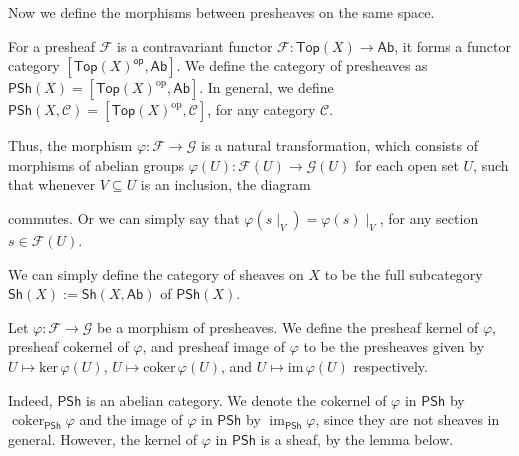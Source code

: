 \documentclass[11pt]{article}
\begin{document}
Now we define the morphisms between presheaves on the same space. 

\begin{definition}
    For a presheaf $\mathscr{F}$ is a contravariant functor 
    $\mathscr{F}: \mathsf{Top}(X) \to \mathsf{Ab}$, 
    it forms a functor category 
    $[\mathsf{Top}(X)^{\mathsf{op}},\mathsf{Ab}]$. 
    We define the category of presheaves as 
    $\mathsf{PSh}(X)=[\mathsf{Top}(X)^{\mathrm{op}},\mathsf{Ab}]$. 
    In general, we define $\mathsf{PSh}(X,\mathcal{C})=[\mathsf{Top}(X)^{\mathrm{op}},\mathcal{C}]$, 
    for any category $ \mathcal{C} $. 

    Thus, the morphism $\varphi: \mathscr{F} \to \mathscr{G}$ 
    is a natural transformation, 
    which consists of morphisms of abelian groups 
    $\varphi(U): \mathscr{F}(U) \to \mathscr{G}(U)$ 
    for each open set $U$, such that whenever 
    $V \subseteq U$ is an inclusion, the diagram 
    \begin{center}
    \end{center}
    commutes. Or we can simply say that $ \varphi(s \mid_{V})=\varphi(s)\mid_{V} $, 
    for any section $ s \in \mathscr{F}(U) $. 

    We can simply define the category of sheaves on $ X $ 
    to be the full subcategory $ \mathsf{Sh}(X):=\mathsf{Sh}(X,\mathsf{Ab}) $ of $ \mathsf{PSh}(X) $. 
\end{definition}

\begin{definition}
    Let $\varphi: \mathscr{F} \to \mathscr{G}$ be a morphism of presheaves. 
    We define the presheaf kernel of $\varphi$, 
    presheaf cokernel of $\varphi$, and presheaf image 
    of $\varphi$ to be the presheaves given by 
    $U \mapsto \mathrm{ker}\,\varphi(U)$, 
    $U \mapsto \mathrm{coker}\,\varphi(U)$, 
    and $U \mapsto \mathrm{im}\,\varphi(U)$ respectively. 
\end{definition}

Indeed, $ \mathsf{PSh} $ is an abelian category. 
We denote the cokernel of $ \varphi $ in $ \mathsf{PSh} $ by 
$ \operatorname{coker}_{\mathsf{PSh}} \varphi $ and the image of $ \varphi $ in $ \mathsf{PSh} $ by 
$ \operatorname{im}_{\mathsf{PSh}} \varphi $, 
since they are not sheaves in general. 
However, the kernel of $ \varphi $ in $ \mathsf{PSh} $ is a sheaf, 
by the lemma below. 
\end{document}
